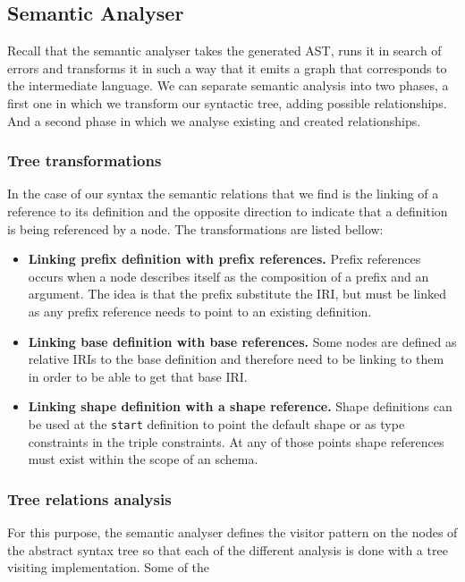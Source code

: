 \subsection{Semantic Analyser}
Recall that the semantic analyser takes the generated AST, runs it in search of errors and transforms it in such a way that
it emits a graph that corresponds to the intermediate language. We can separate semantic analysis into two phases, a first
one in which we transform our syntactic tree, adding possible relationships. And a second phase in which we analyse existing
and created relationships.

\subsubsection{Tree transformations}
In the case of our syntax the semantic relations that we find is the linking of a reference to its definition and the opposite
direction to indicate that a definition is being referenced by a node. The transformations are listed bellow:

\begin{itemize}
    \item \textbf{Linking prefix definition with prefix references.} Prefix references occurs when a node describes itself as
    the composition of a prefix and an argument. The idea is that the prefix substitute the IRI, but must be linked as any
    prefix reference needs to point to an existing definition.
    \item \textbf{Linking base definition with base references.} Some nodes are defined as relative IRIs to the base definition
    and therefore need to be linking to them in order to be able to get that base IRI.
    \item \textbf{Linking shape definition with a shape reference.} Shape definitions can be used at the \texttt{start} definition
    to point the default shape or as type constraints in the triple constraints. At any of those points shape references must
    exist within the scope of an schema.
\end{itemize}

\subsubsection{Tree relations analysis}
For this purpose, the semantic analyser defines the visitor pattern on the nodes of the abstract syntax tree so that each of the different
analysis is done with a tree visiting implementation. Some of the 

